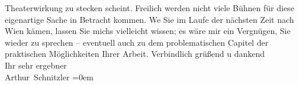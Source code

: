 \begin{ledgroupsized}[t]{13cm}
               Theaterwirkung zu stecken scheint. Freilich werden nicht viele Bühnen für diese
               eigenartige Sache in Betracht kommen. We{\geminationn} Sie im Laufe
               der nächsten Zeit nach Wien kämen, lassen Sie
               michs vielleicht wissen; es wäre mir ein Vergnügen, Sie wieder zu sprechen –
               eventuell auch zu dem problematischen Capitel der praktischen Möglichkeiten Ihrer Arbeit.\pend
           \pstart
           Verbindlich grüßend u dankend{\\[\baselineskip]}Ihr sehr ergebner{\\[\baselineskip]}\spacefill\mbox{Arthur Schnitzler}\pend
           \leftskip=0em{}
         
         \endnumbering{}\end{ledgroupsized}  \newcommand{\dateiname}{L02208}\newcommand{\titel}{Arthur Schnitzler an Robert Adam, 18. 6. 1915}\newcommand{\editorInnen}{Martin Anton Müller und Gerd-Hermann Susen}
      